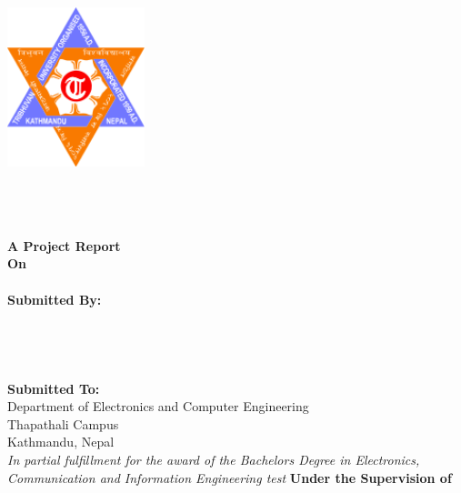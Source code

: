 \begin{titlepage}
   \begin{center}
   	\begin{spacing}{1.5}
   	\includegraphics[width=4cm]{images/logo.png}
   
    \vspace{5mm} 
	\textbf{\MakeUppercase{\cUniversity}}\\
	\textbf{\MakeUppercase{\cDepartment} }\\
	\textbf{\MakeUppercase{\cCampus}} \\
	\vfill
	\textbf{A Project Report \\ On \\ }
	\textbf{\MakeUppercase{\cTitle}}\\
	\vfill
	\textbf{Submitted By:} \\
	\cSubmittedI \\
	\cSubmittedII \\
	\cSubmittedIII \\
	\cSubmittedIV \\
	\vfill
	\textbf{Submitted To:} \\
	Department of Electronics and Computer Engineering \\ Thapathali Campus \\ Kathmandu, Nepal \\
	\vfill
    \textit{In partial fulfillment for the award of the Bachelors Degree in Electronics, Communication and Information Engineering test}
    \vfill
    \textbf{Under the Supervision of} \\
    \cSupervisor \\
    \vfill
    \cDate 
    \end{spacing}
    \end{center}
\end{titlepage}
